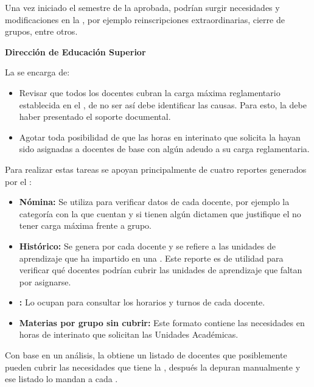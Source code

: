 \begin{PDescripcion}
\begin{enumerate}
		\Ppaso[\PSubProceso] 
		Una vez iniciado el semestre de la  aprobada, podrían surgir necesidades y modificaciones en la , por ejemplo reinscripciones extraordinarias, cierre de grupos, entre otros.
		
	\end{enumerate}
	\Ppaso \textbf{Dirección de Educación Superior}
		
		\begin{enumerate}
		\Ppaso[\PSubProceso] 
			La  se encarga de:
		\begin{itemize}
			\item Revisar que todos los docentes cubran la carga máxima reglamentario establecida en el , de no ser así debe identificar las causas. Para esto, la  debe haber presentado el soporte documental.
			\item Agotar toda posibilidad de que las horas en interinato que solicita la  hayan sido asignadas a docentes de base con algún adeudo a su carga reglamentaria.\\
		\end{itemize}
		Para realizar estas tareas se apoyan principalmente de cuatro reportes generados por el :
		\begin{itemize}
			\item \textbf {Nómina:} Se utiliza para verificar datos de cada docente, por ejemplo la categoría con la que cuentan y si tienen algún dictamen que justifique el no tener carga máxima frente a grupo.
			\item \textbf {Histórico:} Se genera por cada docente y se refiere a las unidades de aprendizaje que ha impartido en una . Este reporte es de utilidad para verificar qué docentes podrían cubrir las unidades de aprendizaje que faltan por asignarse.
			\item \textbf {:} Lo ocupan para consultar los horarios y turnos de cada docente.
			\item \textbf {Materias por grupo sin cubrir:} Este formato contiene las necesidades en horas de interinato que solicitan las Unidades Académicas.
		\end{itemize}
		
		\Ppaso[\PSubProceso] 
		Con base en un análisis, la  obtiene un listado de docentes que posiblemente pueden cubrir las necesidades que tiene la , después la depuran manualmente y ese listado lo mandan a cada .


\end{enumerate}
\end{PDescripcion}
